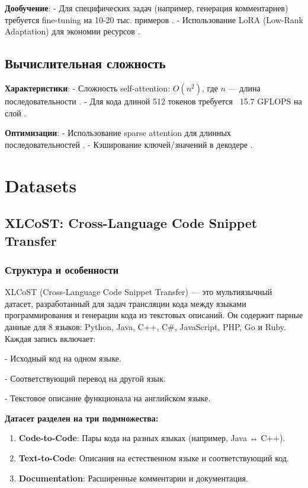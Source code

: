 \documentclass[14pt]{article}
\theoremstyle{definition}
\begin{document}
\textbf{Дообучение}:
- Для специфических задач (например, генерация комментариев) требуется fine-tuning на 10-20 тыс. примеров \cite{husain2019codesearchnet}.
- Использование LoRA (Low-Rank Adaptation) для экономии ресурсов \cite{hu2022lora}.

\subsection{Вычислительная сложность}
\textbf{Характеристики}:
- Сложность self-attention: \(O(n^2)\), где \(n\) — длина последовательности \cite{liu2022survey}.
- Для кода длиной 512 токенов требуется ~15.7 GFLOPS на слой \cite{chen2021codex}.

\textbf{Оптимизации}:
- Использование sparse attention для длинных последовательностей \cite{zaheer2020bigbird}.
- Кэширование ключей/значений в декодере \cite{lu2021codexglue}.









\newpage
\section{Datasets}
\subsection{XLCoST: Cross-Language Code Snippet Transfer}

\subsubsection{Структура и особенности}
XLCoST (Cross-Language Code Snippet Transfer) — это мультиязычный датасет, разработанный для задач трансляции кода между языками программирования и генерации кода из текстовых описаний. Он содержит парные данные для 8 языков: Python, Java, C++, C\#, JavaScript, PHP, Go и Ruby. Каждая запись включает:

    
- Исходный код на одном языке.
    
- Соответствующий перевод на другой язык.
    
- Текстовое описание функционала на английском языке.


\textbf{Датасет разделен на три подмножества:}
\begin{enumerate}
    \item \textbf{Code-to-Code}: Пары кода на разных языках (например, Java ↔ C++).
    \item \textbf{Text-to-Code}: Описания на естественном языке и соответствующий код.
    \item \textbf{Documentation}: Расширенные комментарии и документация.
\end{enumerate}
\end{document}
